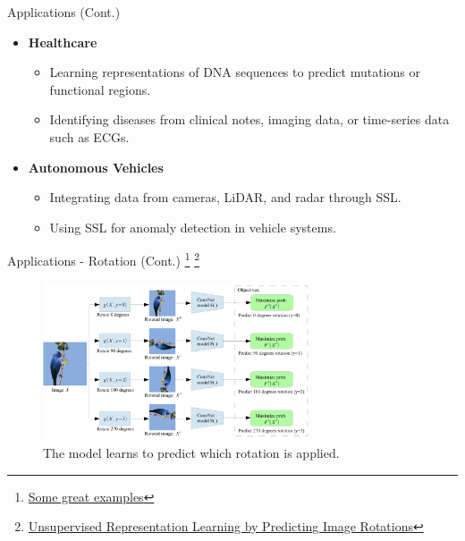 \documentclass[serif, aspectratio=169]{beamer}
\begin{document}
\begin{frame}{Applications (Cont.)}
    \begin{itemize}
        \item \textbf{Healthcare}
        \begin{itemize}
            \item Learning representations of DNA sequences to predict mutations or functional regions.
            \item Identifying diseases from clinical notes, imaging data, or time-series data such as ECGs.
        \end{itemize}

        \item \textbf{Autonomous Vehicles}
        \begin{itemize}
            \item Integrating data from cameras, LiDAR, and radar through SSL.
            \item Using SSL for anomaly detection in vehicle systems.
        \end{itemize}
    \end{itemize}
\end{frame}


\begin{frame}{Applications - Rotation (Cont.)
\footnote{\href{https://www.cnblogs.com/wangxiaocvpr/p/11838766.html}{Some great examples}}
\footnote{\href{https://arxiv.org/abs/1803.07728}{Unsupervised Representation Learning by Predicting Image Rotations}}}    
    \begin{figure}
        \setlength{\abovecaptionskip}{0pt}
        \setlength{\belowcaptionskip}{1pt}
        \centering
        \includegraphics[width=0.7\textwidth]{pic/ssl-applications/rotation.png}
        \caption{The model learns to predict which rotation is applied.}
   \end{figure}
\end{frame}
\end{document}
